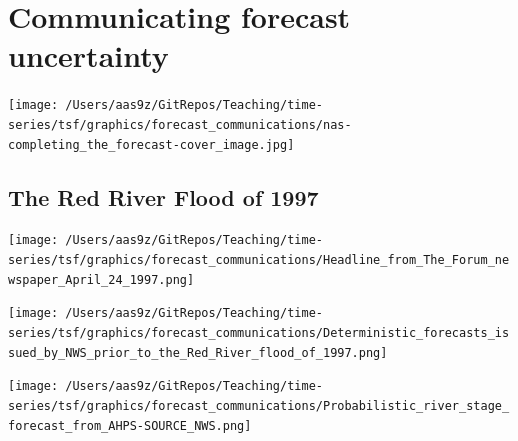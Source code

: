 \documentclass[
]{book}
\begin{document}
\hypertarget{communicating-forecast-uncertainty}{%
\chapter{Communicating forecast uncertainty}\label{communicating-forecast-uncertainty}}

\texttt{[image: /Users/aas9z/GitRepos/Teaching/time-series/tsf/graphics/forecast\_communications/nas-completing\_the\_forecast-cover\_image.jpg]}

\hypertarget{the-red-river-flood-of-1997}{%
\section{The Red River Flood of 1997}\label{the-red-river-flood-of-1997}}

\texttt{[image: /Users/aas9z/GitRepos/Teaching/time-series/tsf/graphics/forecast\_communications/Headline\_from\_The\_Forum\_newspaper\_April\_24\_1997.png]}

\texttt{[image: /Users/aas9z/GitRepos/Teaching/time-series/tsf/graphics/forecast\_communications/Deterministic\_forecasts\_issued\_by\_NWS\_prior\_to\_the\_Red\_River\_flood\_of\_1997.png]}

\texttt{[image: /Users/aas9z/GitRepos/Teaching/time-series/tsf/graphics/forecast\_communications/Probabilistic\_river\_stage\_forecast\_from\_AHPS-SOURCE\_NWS.png]}

  
\end{document}
